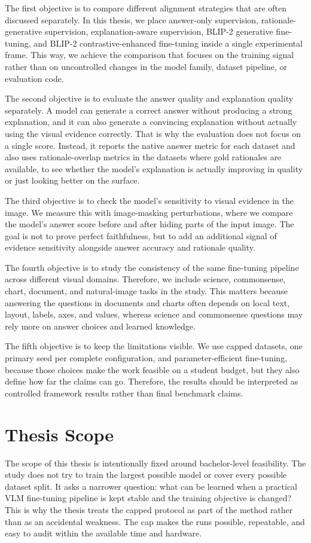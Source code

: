 The first objective is to compare different alignment strategies that are often discussed separately.
In this thesis, we place answer-only supervision, rationale-generative supervision,
explanation-aware supervision, BLIP-2 generative fine-tuning, and BLIP-2 contrastive-enhanced fine-tuning inside a single experimental frame.
This way, we achieve the comparison that focuses on the training signal rather than on uncontrolled changes in the model family, dataset pipeline, or evaluation code.

The second objective is to evaluate the answer quality and explanation quality separately.
A model can generate a correct answer without producing a strong explanation,
and it can also generate a convincing explanation without actually using the visual evidence correctly.
That is why the evaluation does not focus on a single score.
Instead, it reports the native answer metric for each dataset and also uses rationale-overlap metrics in 
the datasets where gold rationales are available, to see whether the model's explanation is actually improving in quality or just looking better on the surface.

The third objective is to check the model's sensitivity to visual evidence in the image.
We measure this with image-masking perturbations, where we compare the model's answer score before and after hiding parts of the input image.
The goal is not to prove perfect faithfulness, but to add an additional signal of evidence sensitivity alongside answer accuracy and rationale quality.

The fourth objective is to study the consistency of the same fine-tuning pipeline across different visual domains.
Therefore, we include science, commonsense, chart, document, and natural-image tasks in the study.
This matters because answering the questions in documents and charts often depends on local text, layout, labels, axes, and values,
whereas science and commonsense questions may rely more on answer choices and learned knowledge.

The fifth objective is to keep the limitations visible.
We use capped datasets, one primary seed per complete configuration, and parameter-efficient fine-tuning,
because those choices make the work feasible on a student budget, but they also define how far the claims can go.
Therefore, the results should be interpreted as controlled framework results rather than final benchmark claims.

\section{Thesis Scope}
The scope of this thesis is intentionally fixed around bachelor-level feasibility.
The study does not try to train the largest possible model or cover every possible dataset split.
It asks a narrower question: what can be learned when a practical VLM fine-tuning pipeline is kept stable and the training objective is changed?
This is why the thesis treats the capped protocol as part of the method rather than as an accidental weakness.
The cap makes the runs possible, repeatable, and easy to audit within the available time and hardware.

